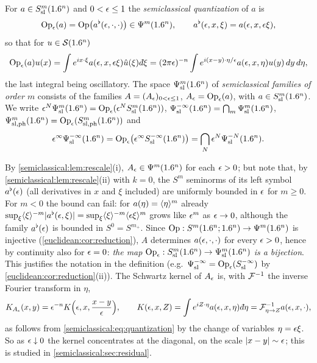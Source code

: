 \begin{definition}\label{semiclassical:def:psisl}
  For $a\in S^{m}_{\mathrm{sl}}(1.6^n)$ and $0<\epsilon\le1$ the \emph{semiclassical
  quantization} of $a$ is
  \begin{equation*}
    \operatorname{Op}_\epsilon(a)=\operatorname{Op}\bigl(a^\flat(\epsilon,\cdot,\cdot)\bigr)\in\Psi^{m}(1.6^n),\qquad
    a^\flat(\epsilon,x,\xi)=a(\epsilon,x,\epsilon\xi),
  \end{equation*}
  so that for $u\in\mathcal{S}(1.6^n)$
  \begin{equation}\label{semiclassical:eq:quantization}
    \Op_\eps(a)u(x)=\int e^{ix\cdot\xi}a(\eps,x,\eps\xi)\hat u(\xi)\,\dbar\xi
    =(2\pi\eps)^{-n}\int e^{i(x-y)\cdot\eta/\eps}a(\eps,x,\eta)u(y)\,dy\,d\eta,
  \end{equation}
  the last integral being oscillatory. The space $\Psi^{m}_{\mathrm{sl}}(1.6^n)$ of
  \emph{semiclassical families of order $m$} consists of the families
  $A=(A_\epsilon)_{0<\epsilon\le1}$, $A_\epsilon=\operatorname{Op}_\epsilon(a)$, with $a\in S^{m}_{\mathrm{sl}}(1.6^n)$.
  We write $\epsilon^N\Psi^{m}_{\mathrm{sl}}(1.6^n)=\operatorname{Op}_\epsilon(\epsilon^NS^{m}_{\mathrm{sl}}(1.6^n))$,
  $\Psi^{-\infty}_{\mathrm{sl}}(1.6^n)=\bigcap_m\Psi^{m}_{\mathrm{sl}}(1.6^n)$, $\Psi^{m}_{\mathrm{sl,ph}}(1.6^n)=\operatorname{Op}_\epsilon(S^{m}_{\mathrm{sl,ph}}(1.6^n))$
  and
  \begin{equation*}
    \epsilon^\infty\Psi^{-\infty}_{\mathrm{sl}}(1.6^n)=\operatorname{Op}_\epsilon\bigl(\epsilon^\infty S^{-\infty}_{\mathrm{sl}}(1.6^n)\bigr)=\bigcap_N\epsilon^N\Psi^{-N}_{\mathrm{sl}}(1.6^n).
  \end{equation*}
\end{definition}

By \cref{semiclassical:lem:rescale}(i), $A_\epsilon\in\Psi^{m}(1.6^n)$ for each
$\epsilon>0$; but note that, by \cref{semiclassical:lem:rescale}(ii) with $k=0$, the
$S^m$ seminorms of its left symbol $a^\flat(\epsilon)$ (all derivatives in $x$ and $\xi$ included)
are uniformly bounded in $\epsilon$ for $m\ge0$. For $m<0$ the bound can fail: for
$a(\eta)=\langle \eta\rangle^m$ already $\sup_\xi\langle \xi\rangle^{-m}\lvert a^\flat(\epsilon,\xi)\rvert
=\sup_\xi\langle \xi\rangle^{-m}\langle \epsilon\xi\rangle^m$ grows like $\epsilon^m$ as $\epsilon\to0$, although the family
$a^\flat(\epsilon)$ is bounded in $S^0=S^{m_+}$. Since $\operatorname{Op}:S^m(1.6^n;1.6^n)\to\Psi^{m}(1.6^n)$ is injective
(\cref{euclidean:cor:reduction}), $A$ determines $a(\epsilon,\cdot,\cdot)$ for every
$\epsilon>0$, hence by continuity also for $\epsilon=0$: \emph{the map
$\operatorname{Op}_\epsilon:S^{m}_{\mathrm{sl}}(1.6^n)\to\Psi^{m}_{\mathrm{sl}}(1.6^n)$ is a bijection}. This justifies the
notation in the definition (e.g.\ $\Psi^{-\infty}_{\mathrm{sl}}=\operatorname{Op}_\epsilon(S^{-\infty}_{\mathrm{sl}})$ by
\cref{euclidean:cor:reduction}(ii)). The Schwartz kernel of $A_\epsilon$ is, with
$\mathcal{F}^{-1}$ the inverse Fourier transform in $\eta$,
\begin{equation}\label{semiclassical:eq:kernel}
  K_{A_\eps}(x,y)=\eps^{-n}K\Bigl(\eps,x,\frac{x-y}\eps\Bigr),\qquad
  K(\eps,x,Z)=\int e^{iZ\cdot\eta}a(\eps,x,\eta)\,\dbar\eta=\cF^{-1}_{\eta\to Z}a(\eps,x,\cdot),
\end{equation}
as follows from \eqref{semiclassical:eq:quantization} by the change of variables
$\eta=\epsilon\xi$. So as $\epsilon\downarrow0$ the kernel concentrates at the diagonal,
on the scale $\lvert x-y\rvert\sim\epsilon$; this is studied in
\cref{semiclassical:sec:residual}.

